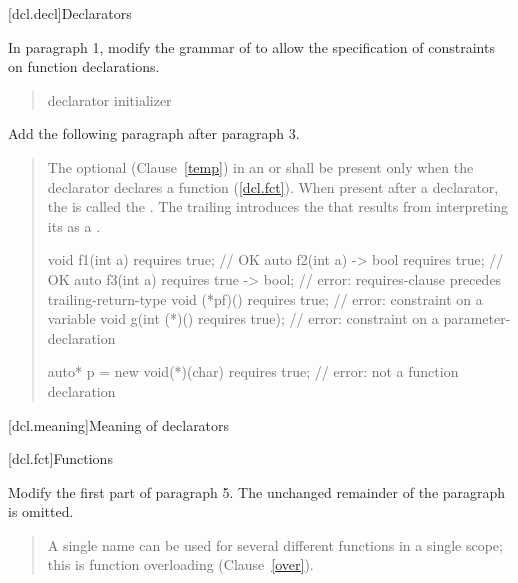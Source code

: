 [dcl.decl]{Declarators}

In paragraph 1, modify the grammar of  to
allow the specification of constraints on function declarations.

\begin{quote}
\pnum
\begin{bnf}
\br
    declarator initializer\opt\br
\end{bnf}
\end{quote}

Add the following paragraph after paragraph 3.

\setcounter{Paras}{2}
\begin{quote}
\begin{addedblock}
\pnum
The optional  (Clause~\ref{temp}) in an
 or 
shall be present only when the declarator declares a 
function (\ref{dcl.fct}).
% 
When present after a declarator, the  
is called the .
The trailing  introduces the
 that results from interpreting
its  as a
.
% 
\enterexample
\begin{codeblock}
void f1(int a) requires true;         // OK
auto f2(int a) -> bool requires true; // OK
auto f3(int a) requires true -> bool; // error: requires-clause precedes trailing-return-type
void (*pf)() requires true;           // error: constraint on a variable
void g(int (*)() requires true);      // error: constraint on a parameter-declaration
  
auto* p = new void(*)(char) requires true; // error: not a function declaration
\end{codeblock}
\exitexample
\end{addedblock}
\end{quote}


\setcounter{section}{2}
[dcl.meaning]{Meaning of declarators}


\setcounter{subsection}{4}
[dcl.fct]{Functions}

Modify the first part of paragraph 5. The unchanged remainder of the paragraph
is omitted.

\begin{quote}
\setcounter{Paras}{4}
\pnum
A single name can be used for several different functions in a single 
scope; this is function overloading (Clause~\ref{over}). 
%
\end{quote}

